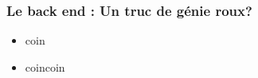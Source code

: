 \speaker{\Florian}
\begin{frame}
  \frametitle{Le back end : Un truc de génie roux?}
  \begin{itemize}
    \item coin
    \item coincoin
  \end{itemize}
\end{frame}

